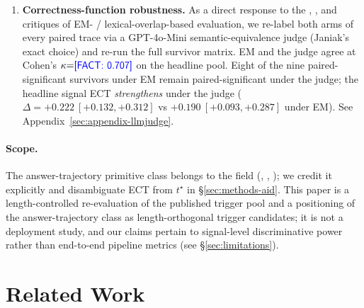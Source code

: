 \documentclass[11pt]{article}
\newcommand{\FACT}[1]{{\color{blue}\textsf{[FACT: #1]}}}
\begin{document}
\begin{enumerate}
\item \textbf{Correctness-function robustness.} As a direct response to
the \citet{Janiak_IllusionProgressHallucinationDetection},
\citet{Santilli_RevisitingUQEvaluationLengthBias}, and
\citet{Ielanskyi_PitfallsUQEvaluationNLG} critiques of EM- /
lexical-overlap-based evaluation, we re-label both arms of every paired
trace via a GPT-4o-Mini semantic-equivalence judge (Janiak's exact
choice) and re-run the full survivor matrix. EM and the judge agree at
Cohen's $\kappa{=}\FACT{0.707}$ on the headline pool. Eight of the nine
paired-significant survivors under EM remain paired-significant under
the judge; the headline signal ECT \emph{strengthens} under the judge
($\Delta{=}+0.222~[+0.132,+0.312]$ vs $+0.190~[+0.093,+0.287]$ under
EM). See Appendix~\ref{sec:appendix-llmjudge}.
\end{enumerate}

\paragraph{Scope.}
The answer-trajectory primitive class belongs to the field
(\citealp{Datta_DecideEarlyExplainLater}, \citealp{Wang_ChainOfProbeCoTStepByStep},
\citealp{Chen_DynamicInstabilityLLMReasoning}); we credit it explicitly
and disambiguate ECT from $t^\star$ in \S\ref{sec:methods-aid}. This
paper is a length-controlled re-evaluation of the published trigger pool
and a positioning of the answer-trajectory class as length-orthogonal
trigger candidates; it is not a deployment study, and our
claims pertain to signal-level discriminative power rather than end-to-end
pipeline metrics (see \S\ref{sec:limitations}).


\section{Related Work}
\label{sec:related}

\end{document}
